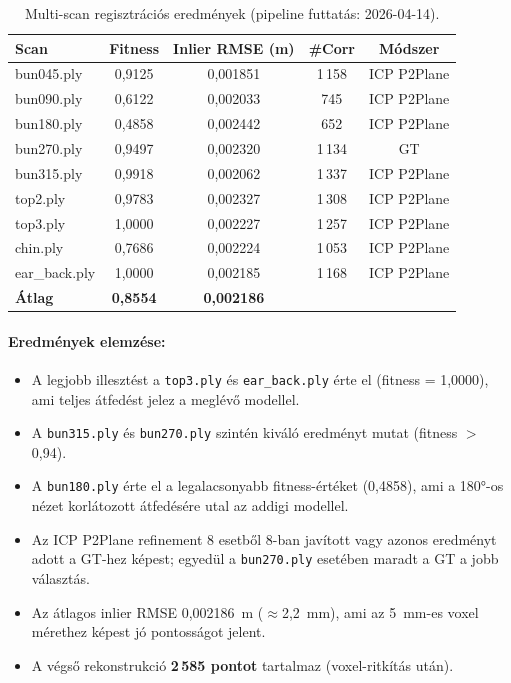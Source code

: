 \documentclass[12pt,a4paper]{article}
\begin{document}
\begin{table}[H]
\centering
\begin{tabular}{lcccc}
\toprule
\textbf{Scan} & \textbf{Fitness} & \textbf{Inlier RMSE (m)} & \textbf{\#Corr} & \textbf{Módszer} \\
\midrule
bun045.ply     & 0,9125 & 0,001851 & 1\,158 & ICP P2Plane \\
bun090.ply     & 0,6122 & 0,002033 &   745 & ICP P2Plane \\
bun180.ply     & 0,4858 & 0,002442 &   652 & ICP P2Plane \\
bun270.ply     & 0,9497 & 0,002320 & 1\,134 & GT \\
bun315.ply     & 0,9918 & 0,002062 & 1\,337 & ICP P2Plane \\
top2.ply       & 0,9783 & 0,002327 & 1\,308 & ICP P2Plane \\
top3.ply       & 1,0000 & 0,002227 & 1\,257 & ICP P2Plane \\
chin.ply       & 0,7686 & 0,002224 & 1\,053 & ICP P2Plane \\
ear\_back.ply  & 1,0000 & 0,002185 & 1\,168 & ICP P2Plane \\
\midrule
\textbf{Átlag} & \textbf{0,8554} & \textbf{0,002186} & & \\
\bottomrule
\end{tabular}
\caption{Multi-scan regisztrációs eredmények (pipeline futtatás: 2026-04-14).}
\end{table}

\paragraph{Eredmények elemzése:}
\begin{itemize}[nosep]
    \item A legjobb illesztést a \texttt{top3.ply} és \texttt{ear\_back.ply} érte el (fitness = 1,0000), ami teljes átfedést jelez a meglévő modellel.
    \item A \texttt{bun315.ply} és \texttt{bun270.ply} szintén kiváló eredményt mutat (fitness $>$ 0,94).
    \item A \texttt{bun180.ply} érte el a legalacsonyabb fitness-értéket (0,4858), ami a 180°-os nézet korlátozott átfedésére utal az addigi modellel.
    \item Az ICP P2Plane refinement 8 esetből 8-ban javított vagy azonos eredményt adott a GT-hez képest; egyedül a \texttt{bun270.ply} esetében maradt a GT a jobb választás.
    \item Az átlagos inlier RMSE 0,002186~m ($\approx$2,2~mm), ami az 5~mm-es voxel mérethez képest jó pontosságot jelent.
    \item A végső rekonstrukció \textbf{2\,585 pontot} tartalmaz (voxel-ritkítás után).
\end{itemize}
\end{document}
